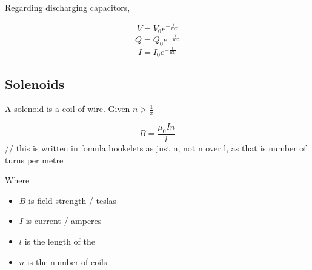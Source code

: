 \documentclass{article}
\begin{document}
\noindent Regarding discharging capacitors,

\[V=V_0e^{-\frac{t}{RC}}\]
\[Q=Q_0e^{-\frac{t}{RC}}\]
\[I=I_0e^{-\frac{t}{RC}}\]

\subsection{Solenoids}

A solenoid is a coil of wire. Given $n>\frac{1}{\pi}$

\[B=\frac{\mu_0In}{l}\] // this is written in fomula bookelets as just n, not n over l, as that is number of turns per metre

\noindent Where\begin{itemize}

    \item $B$ is field strength / teslas
    \item $I$ is current / amperes
    \item $l$ is the length of the 
    \item $n$ is the number of coils

\end{itemize}
\end{document}
